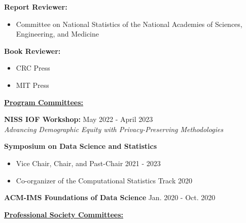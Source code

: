 \vspace{-2pt}
\textbf{Report Reviewer:}
\begin{itemize}
    \item Committee on National Statistics of the National Academies of Sciences, Engineering, and Medicine
\end{itemize}

\vspace{5pt}
\textbf{Book Reviewer:}
\vspace{-10pt}
\begin{multicols}{2}
    \begin{itemize}
        \item CRC Press
        \item MIT Press
    \end{itemize}
\end{multicols}

\underline{\textbf{\large Program Committees:}}\normalsize

\textbf{NISS IOF Workshop:} \hfill May 2022 - April 2023\\
\textit{Advancing Demographic Equity with Privacy-Preserving Methodologies}
\professionalspace

\textbf{Symposium on Data Science and Statistics}
\begin{itemize}
    \item Vice Chair, Chair, and Past-Chair \hfill 2021 - 2023
    \item Co-organizer of the Computational Statistics Track \hfill 2020
\end{itemize}
\leadershipspace
\textbf{ACM-IMS Foundations of Data Science} \hfill Jan. 2020 - Oct. 2020

\professionalspace
\underline{\textbf{\large Professional Society Committees:}}\normalsize

